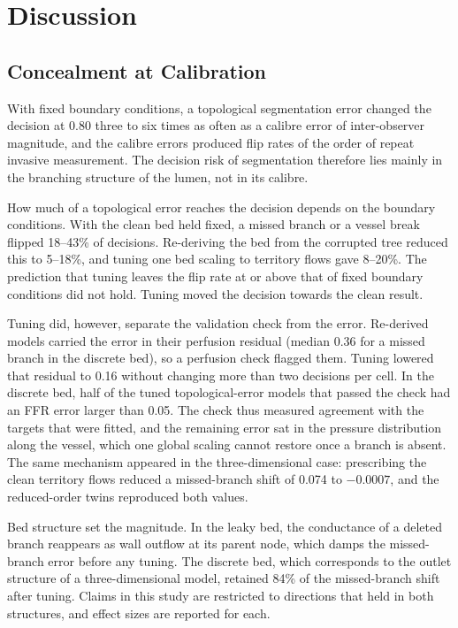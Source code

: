 \documentclass[journal]{IEEEtran}
\begin{document}
\section{Discussion}
\subsection{Concealment at Calibration}
With fixed boundary conditions, a topological segmentation error changed the decision at 0.80 three to six times
as often as a calibre error of inter-observer magnitude, and the calibre errors produced flip rates of the order of repeat invasive measurement. The
decision risk of segmentation therefore lies mainly in the branching structure of the lumen, not in its calibre.

How much of a topological error reaches the decision depends on the boundary conditions. With the clean bed held
fixed, a missed branch or a vessel break flipped 18--43\% of decisions. Re-deriving the bed from the corrupted tree
reduced this to 5--18\%, and tuning one bed scaling to territory flows gave 8--20\%. The prediction that tuning leaves
the flip rate at or above that of fixed boundary conditions did not hold. Tuning moved the decision towards the
clean result.

Tuning did, however, separate the validation check from the error. Re-derived models carried the error in their
perfusion residual (median 0.36 for a missed branch in the discrete bed), so a perfusion check flagged them. Tuning
lowered that residual to 0.16 without changing more than two decisions per cell. In the discrete bed, half of the
tuned topological-error models that passed the check had an FFR error larger than 0.05. The check thus measured
agreement with the targets that were fitted, and the remaining error sat in the pressure distribution along the
vessel, which one global scaling cannot restore once a branch is absent. The same mechanism appeared in the
three-dimensional case: prescribing the clean territory flows reduced a missed-branch shift of 0.074 to $-0.0007$,
and the reduced-order twins reproduced both values.

Bed structure set the magnitude. In the leaky bed, the conductance of a deleted branch reappears as wall outflow at
its parent node, which damps the missed-branch error before any tuning. The discrete bed, which corresponds to the
outlet structure of a three-dimensional model, retained 84\% of the missed-branch shift after tuning. Claims in this
study are restricted to directions that held in both structures, and effect sizes are reported for each.
\end{document}
